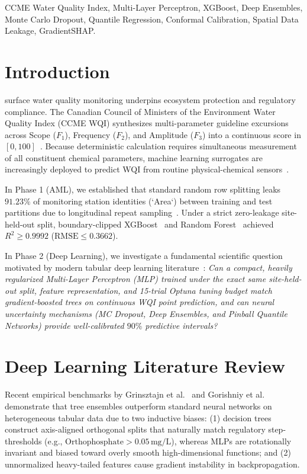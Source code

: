 \documentclass[journal,10pt,twocolumn]{IEEEtran}
\begin{document}
\begin{IEEEkeywords}
CCME Water Quality Index, Multi-Layer Perceptron, XGBoost, Deep Ensembles, Monte Carlo Dropout, Quantile Regression, Conformal Calibration, Spatial Data Leakage, GradientSHAP.
\end{IEEEkeywords}

\section{Introduction}
 surface water quality monitoring underpins ecosystem protection and regulatory compliance. The Canadian Council of Ministers of the Environment Water Quality Index (CCME WQI) synthesizes multi-parameter guideline excursions across Scope ($F_1$), Frequency ($F_2$), and Amplitude ($F_3$) into a continuous score in $[0, 100]$~\cite{ccme2001, lumb2006application}. Because deterministic calculation requires simultaneous measurement of all constituent chemical parameters, machine learning surrogates are increasingly deployed to predict WQI from routine physical-chemical sensors~\cite{palani2008ann, ahmed2019efficient, karim2025comprehensive}.

In Phase 1 (AML), we established that standard random row splitting leaks $91.23\%$ of monitoring station identities (`Area`) between training and test partitions due to longitudinal repeat sampling~\cite{roberts2017cross, kaufman2012leakage}. Under a strict zero-leakage site-held-out split, boundary-clipped XGBoost~\cite{chen2016xgboost} and Random Forest~\cite{breiman2001random} achieved $R^2 \ge 0.9992$ ($\text{RMSE} \le 0.3662$).

In Phase 2 (Deep Learning), we investigate a fundamental scientific question motivated by modern tabular deep learning literature~\cite{grinsztajn2022tree, gorishniy2021revisiting}: \textit{Can a compact, heavily regularized Multi-Layer Perceptron (MLP) trained under the exact same site-held-out split, feature representation, and 15-trial Optuna tuning budget match gradient-boosted trees on continuous WQI point prediction, and can neural uncertainty mechanisms (MC Dropout, Deep Ensembles, and Pinball Quantile Networks) provide well-calibrated $90\%$ predictive intervals?}

\section{Deep Learning Literature Review}
Recent empirical benchmarks by Grinsztajn et al.~\cite{grinsztajn2022tree} and Gorishniy et al.~\cite{gorishniy2021revisiting} demonstrate that tree ensembles outperform standard neural networks on heterogeneous tabular data due to two inductive biases: (1) decision trees construct axis-aligned orthogonal splits that naturally match regulatory step-thresholds (e.g., $\text{Orthophosphate} > 0.05\,\text{mg/L}$), whereas MLPs are rotationally invariant and biased toward overly smooth high-dimensional functions; and (2) unnormalized heavy-tailed features cause gradient instability in backpropagation.
\end{document}
